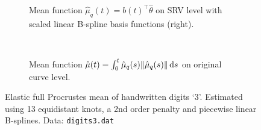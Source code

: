 \begin{figure}[t]
  \centering
  \begin{subfigure}{\textwidth}
    \begin{subfigure}{.48\textwidth}
      \centering
    \end{subfigure}\hfill%
    \begin{subfigure}{.48\textwidth}
      \centering
      \begin{subfigure}{\textwidth}
        \centering
      \end{subfigure}
      \begin{subfigure}{\textwidth}
        \centering
      \end{subfigure}
    \end{subfigure}
    \caption{Mean function $\hat\mu_q(t) = b(t)^\top \hat\theta$ on SRV level with scaled linear B-spline basis functions (right).}
  \end{subfigure}\vspace{0.66em}\\
  \begin{subfigure}{\textwidth}
    \centering
    \begin{subfigure}{.48\textwidth}
      \centering
    \end{subfigure}\hfill%
    \begin{subfigure}{.48\textwidth}
      \centering
      \begin{subfigure}{\textwidth}
        \centering
      \end{subfigure}
      \begin{subfigure}{\textwidth}
        \centering
      \end{subfigure}
    \end{subfigure}
    \caption{Mean function $\hat\mu(t) = \int_0^t \hat\mu_q(s) \lVert\hat\mu_q(s)\rVert \mathop{\mathrm{d}s}$ on original curve level.}
  \end{subfigure}
  \caption{Elastic full Procrustes mean of handwritten digits \enquote*{3}.
    Estimated using 13 equidistant knots, a 2nd order penalty and piecewise linear B-splines.
    Data: \texttt{digits3.dat}}
  \label{fig:3-mean}
\end{figure}


